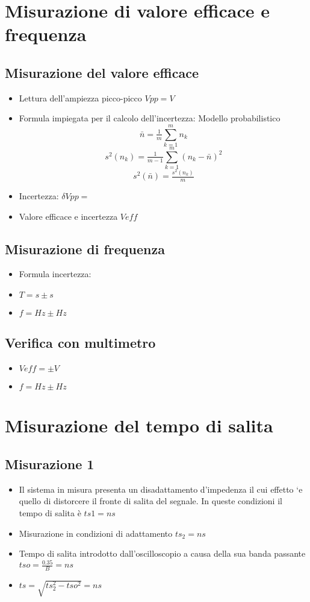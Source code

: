 \documentclass{report}
\begin{document}
\chapter{Misurazione di valore efficace e frequenza}

\section{Misurazione del valore efficace}

\begin{itemize}
\item Lettura dell’ampiezza picco-picco \(Vpp= V\)
\item Formula impiegata per il calcolo dell’incertezza: Modello probabilistico \[\bar{n} = \tfrac{1}{m}\sum_{k=1}^m n_k \]
\[s^2 (n_k)= \tfrac{1}{m-1}\sum_{k=1}^m (n_k - \bar{n})^2 \] 
\[s^2 (\bar{n}) = \tfrac{s^2 (n_k)}{m}\]
\item Incertezza: \(\delta{}  Vpp= \)
\item Valore efficace e incertezza \(Veff \)
\end{itemize}

\section{Misurazione di frequenza}
\begin{itemize}
\item Formula incertezza:
\item \(T= s\pm s \)
\item \(f= Hz \pm Hz\)
\end{itemize}

\section{Verifica con multimetro}
\begin{itemize}
\item \(Veff= \pm V \)
\item \(f= Hz \pm Hz \)
\end{itemize}

\chapter{Misurazione del tempo di salita}

\section{ Misurazione 1}
\begin{itemize}
\item Il sistema in misura presenta un disadattamento d’impedenza il cui effetto `e quello di distorcere il fronte di salita del segnale. In queste condizioni il tempo di salita è \(ts1 = ns\)
\item Misurazione in condizioni di adattamento \(ts_2 = ns\) 
\item Tempo di salita introdotto dall’oscilloscopio a causa della sua banda passante \(tso=\tfrac{0.35}{B} = ns\)
\item \(ts= \sqrt{ts_2^2 -tso^2} = ns\)
\end{itemize}
\end{document}
